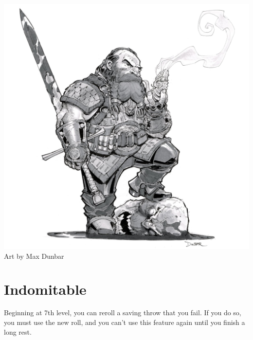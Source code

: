 \begin{multicols*}{2}
\begin{Figure}
\centering
\includegraphics[width=\textwidth]{img/fighter-dwarf.png}
{\scriptsize Art by Max Dunbar}
\end{Figure}
    

\section*{Indomitable}

Beginning at 7th level, you can reroll a saving throw that you fail. If you do so, you must use the new roll, and you can’t use this feature again until you finish a long rest.


\end{multicols*}

\clearpage





